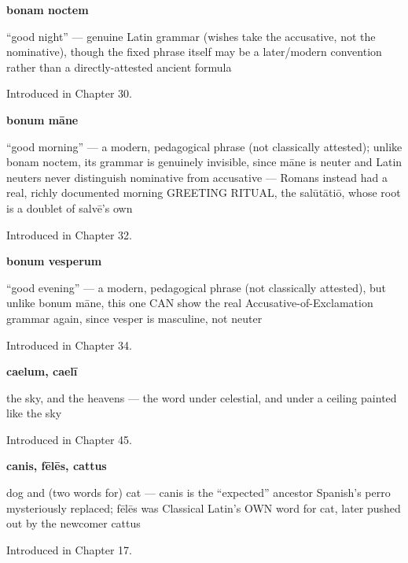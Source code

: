 \noindent\begin{minipage}[t]{\linewidth}
\raggedright
\textbf{bonam noctem}\par
\small \textquotedblleft{}good night\textquotedblright{} — genuine Latin grammar (wishes take the accusative, not the nominative), though the fixed phrase itself may be a later/modern convention rather than a directly-attested ancient formula\par
\footnotesize Introduced in Chapter 30.
\end{minipage}\par\medskip

\noindent\begin{minipage}[t]{\linewidth}
\raggedright
\textbf{bonum māne}\par
\small \textquotedblleft{}good morning\textquotedblright{} — a modern, pedagogical phrase (not classically attested); unlike bonam noctem, its grammar is genuinely invisible, since māne is neuter and Latin neuters never distinguish nominative from accusative — Romans instead had a real, richly documented morning GREETING RITUAL, the salūtātiō, whose root is a doublet of salvē's own\par
\footnotesize Introduced in Chapter 32.
\end{minipage}\par\medskip

\noindent\begin{minipage}[t]{\linewidth}
\raggedright
\textbf{bonum vesperum}\par
\small \textquotedblleft{}good evening\textquotedblright{} — a modern, pedagogical phrase (not classically attested), but unlike bonum māne, this one CAN show the real Accusative-of-Exclamation grammar again, since vesper is masculine, not neuter\par
\footnotesize Introduced in Chapter 34.
\end{minipage}\par\medskip

\noindent\begin{minipage}[t]{\linewidth}
\raggedright
\textbf{caelum, caelī}\par
\small the sky, and the heavens — the word under celestial, and under a ceiling painted like the sky\par
\footnotesize Introduced in Chapter 45.
\end{minipage}\par\medskip

\noindent\begin{minipage}[t]{\linewidth}
\raggedright
\textbf{canis, fēlēs, cattus}\par
\small dog and (two words for) cat — canis is the \textquotedblleft{}expected\textquotedblright{} ancestor Spanish's perro mysteriously replaced; fēlēs was Classical Latin's OWN word for cat, later pushed out by the newcomer cattus\par
\footnotesize Introduced in Chapter 17.
\end{minipage}\par\medskip

